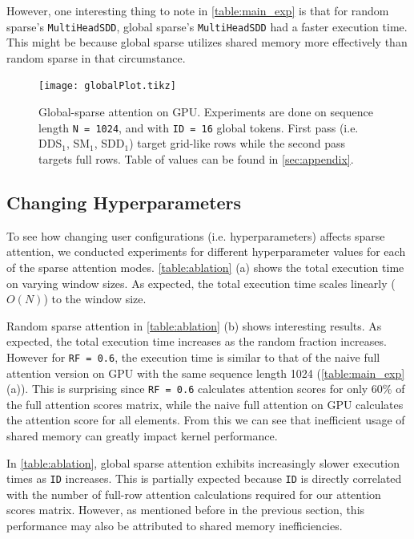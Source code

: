 \documentclass[11pt]{article}
\begin{document}
However, one interesting thing to note in \autoref{table:main_exp} is that for random sparse's \texttt{MultiHeadSDD}, global sparse's \texttt{MultiHeadSDD} had a faster execution time. This might be because global sparse utilizes shared memory more effectively than random sparse in that circumstance. 


\begin{figure}[ht]
\testdata
    \centering
    \texttt{[image: globalPlot.tikz]}
    \caption{Global-sparse attention on GPU. Experiments are done on sequence length \texttt{N = 1024}, and with \texttt{ID = 16} global tokens. First pass (i.e. DDS$_1$, SM$_1$, SDD$_1$) target grid-like rows while the second pass targets full rows. Table of values can be found in \autoref{sec:appendix}.}
    \label{fig:globalZoom}
\end{figure}

\subsection{Changing Hyperparameters}
To see how changing user configurations (i.e. hyperparameters) affects sparse attention, we conducted experiments for different hyperparameter values for each of the sparse attention modes. \autoref{table:ablation} (a) shows the total execution time on varying window sizes. As expected, the total execution time scales linearly ($O(N)$) to the window size.

Random sparse attention in \autoref{table:ablation} (b) shows interesting results. As expected, the total execution time increases as the random fraction increases. However for \texttt{RF = 0.6}, the execution time is similar to that of the naive full attention version on GPU with the same sequence length 1024 (\autoref{table:main_exp} (a)). This is surprising since \texttt{RF = 0.6} calculates attention scores for only 60\% of the full attention scores matrix, while the naive full attention on GPU calculates the attention score for all elements. From this we can see that inefficient usage of shared memory can greatly impact kernel performance.

In \autoref{table:ablation}, global sparse attention exhibits increasingly slower execution times as \texttt{ID} increases. This is partially expected because \texttt{ID} is directly correlated with the number of full-row attention calculations required for our attention scores matrix. However, as mentioned before in the previous section, this performance may also be attributed to shared memory inefficiencies.
\end{document}
